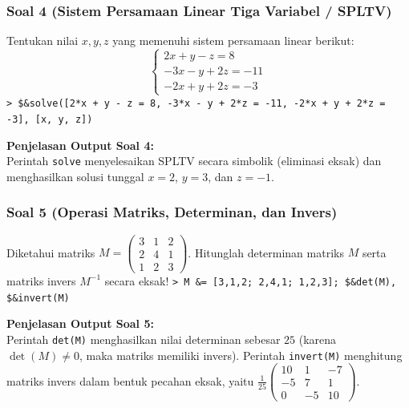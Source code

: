 \documentclass[11pt, a4paper]{article}
\newcommand{\emtcmd}[1]{\noindent\texttt{\textcolor{emtcommand}{>}\ #1}\par\smallskip}
\begin{document}
\subsubsection*{Soal 4 (Sistem Persamaan Linear Tiga Variabel / SPLTV)}
Tentukan nilai $x, y, z$ yang memenuhi sistem persamaan linear berikut:
$$\begin{cases} 2x + y - z = 8 \\ -3x - y + 2z = -11 \\ -2x + y + 2z = -3 \end{cases}$$
\emtcmd{\$\&solve([2*x + y - z = 8, -3*x - y + 2*z = -11, -2*x + y + 2*z = -3], [x, y, z])}

\textbf{Penjelasan Output Soal 4:} \\
Perintah \texttt{solve} menyelesaikan SPLTV secara simbolik (eliminasi eksak) dan menghasilkan solusi tunggal $x = 2$, $y = 3$, dan $z = -1$.

\subsubsection*{Soal 5 (Operasi Matriks, Determinan, dan Invers)}
Diketahui matriks $M = \begin{pmatrix} 3 & 1 & 2 \\ 2 & 4 & 1 \\ 1 & 2 & 3 \end{pmatrix}$. Hitunglah determinan matriks $M$ serta matriks invers $M^{-1}$ secara eksak!
\emtcmd{M \&= [3,1,2; 2,4,1; 1,2,3]; \$\&det(M), \$\&invert(M)}

\textbf{Penjelasan Output Soal 5:} \\
Perintah \texttt{det(M)} menghasilkan nilai determinan sebesar $25$ (karena $\det(M) \neq 0$, maka matriks memiliki invers). Perintah \texttt{invert(M)} menghitung matriks invers dalam bentuk pecahan eksak, yaitu $\frac{1}{25} \begin{pmatrix} 10 & 1 & -7 \\ -5 & 7 & 1 \\ 0 & -5 & 10 \end{pmatrix}$.
\end{document}
